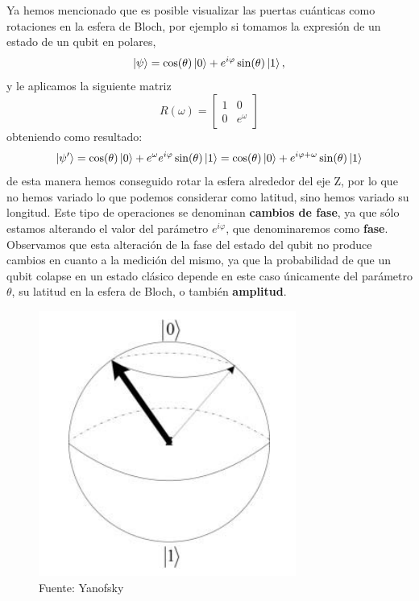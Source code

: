 \documentclass[a4paper]{article}
\numberwithin{equation}{section}
\begin{document}
Ya hemos mencionado que es posible visualizar las puertas cuánticas como rotaciones en la esfera de Bloch, por ejemplo si tomamos la expresión de un estado de un qubit en polares,
\begin{equation}
\ket{\psi} = \cos(\theta)\ket{0} + e^{i\varphi}\sin(\theta)\ket{1},
\end{equation}
y le aplicamos la siguiente matriz
\begin{equation}
R(\omega) = \begin{bmatrix}
	1 & 0 \\
	0 & e^\omega
\end{bmatrix} 
\end{equation}
obteniendo como resultado:
\begin{equation}
\ket{\psi'} = \cos(\theta)\ket{0} + e^\omega e^{i\varphi}\sin(\theta)\ket{1} = \cos(\theta)\ket{0} + e^{i\varphi + \omega}\sin(\theta)\ket{1}
\end{equation}
de esta manera hemos conseguido rotar la esfera alrededor del eje Z, por lo que no hemos variado lo que podemos considerar como latitud, sino hemos variado su longitud. Este tipo de operaciones se denominan \textbf{cambios de fase}, ya que sólo estamos alterando el valor del parámetro $e^{i\varphi}$, que denominaremos como \textbf{fase}. Observamos que esta alteración de la fase del estado del qubit no produce cambios en cuanto a la medición del mismo, ya que la probabilidad de que un qubit colapse en un estado clásico depende en este caso únicamente del parámetro $\theta$, su latitud en la esfera de Bloch, o también \textbf{amplitud}.

\begin{figure}[h]
	\centering
	\includegraphics[scale=.65]{rotacion_fase}
	\caption{Fuente: Yanofsky \cite{yanofsky2008quantum}}
\end{figure}
\end{document}
